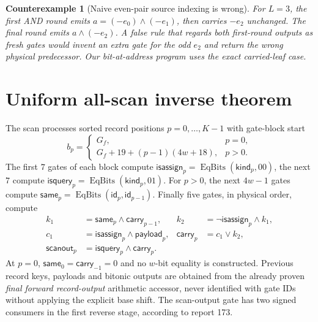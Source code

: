 \documentclass[11pt]{article}
\newtheorem{counterexample}[theorem]{Counterexample}
\begin{document}
\begin{counterexample}[Naive even-pair source indexing is wrong]
For $L=3$, the first AND round emits $a=(-e_0)\wedge(-e_1)$, then carries $-e_2$ unchanged. The final round emits $a\wedge(-e_2)$. A false rule that regards both first-round outputs as fresh gates would invent an extra gate for the odd $e_2$ and return the wrong physical predecessor. Our bit-at-address program uses the exact carried-leaf case.
\end{counterexample}

\section{Uniform all-scan inverse theorem}
The scan processes sorted record positions $p=0,\ldots,K-1$ with gate-block start
\[
 b_p=\begin{cases}G_f,&p=0,\\G_f+19+(p-1)(4w+18),&p>0.\end{cases}
\]
The first $7$ gates of each block compute $\mathsf{isassign}_p=\operatorname{EqBits}(\mathsf{kind}_p,00)$, the next $7$ compute $\mathsf{isquery}_p=\operatorname{EqBits}(\mathsf{kind}_p,01)$. For $p>0$, the next $4w-1$ gates compute $\mathsf{same}_p=\operatorname{EqBits}(\mathsf{id}_p,\mathsf{id}_{p-1})$. Finally five gates, in physical order, compute
\begin{align*}
 k_1&=\mathsf{same}_p\wedge\mathsf{carry}_{p-1},&k_2&=\neg\mathsf{isassign}_p\wedge k_1,\\
 c_1&=\mathsf{isassign}_p\wedge\mathsf{payload}_p,&
 \mathsf{carry}_p&=c_1\vee k_2,\\
 \mathsf{scanout}_p&=\mathsf{isquery}_p\wedge\mathsf{carry}_p.
\end{align*}
At $p=0$, $\mathsf{same}_0=\mathsf{carry}_{-1}=0$ and no $w$-bit equality is constructed. Previous record keys, payloads and bitonic outputs are obtained from the already proven \emph{final forward record-output} arithmetic accessor, never identified with gate IDs without applying the explicit base shift. The scan-output gate has two signed consumers in the first reverse stage, according to report 173.
\end{document}

